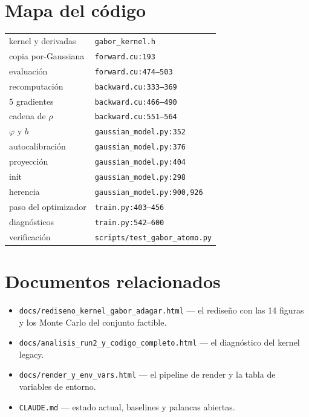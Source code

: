 \documentclass[12pt]{extarticle}
\newcommand{\code}[1]{\texttt{#1}}
\begin{document}
\section{Mapa del código}

\begin{center}\small
\begin{tabular}{@{}ll@{}}
\toprule
kernel y derivadas & \code{gabor\_kernel.h} \\
copia por-Gaussiana & \code{forward.cu:193} \\
evaluación & \code{forward.cu:474--503} \\
recomputación & \code{backward.cu:333--369} \\
5 gradientes & \code{backward.cu:466--490} \\
cadena de $\rho$ & \code{backward.cu:551--564} \\
$\varphi$ y $b$ & \code{gaussian\_model.py:352} \\
autocalibración & \code{gaussian\_model.py:376} \\
proyección & \code{gaussian\_model.py:404} \\
init & \code{gaussian\_model.py:298} \\
herencia & \code{gaussian\_model.py:900,926} \\
paso del optimizador & \code{train.py:403--456} \\
diagnósticos & \code{train.py:542--600} \\
verificación & \code{scripts/test\_gabor\_atomo.py} \\
\bottomrule
\end{tabular}
\end{center}

\section{Documentos relacionados}

\begin{itemize}
\item \code{docs/rediseno\_kernel\_gabor\_adagar.html} --- el rediseño con
      las 14 figuras y los Monte Carlo del conjunto factible.
\item \code{docs/analisis\_run2\_y\_codigo\_completo.html} --- el diagnóstico
      del kernel legacy.
\item \code{docs/render\_y\_env\_vars.html} --- el pipeline de render y la
      tabla de variables de entorno.
\item \code{CLAUDE.md} --- estado actual, baselines y palancas abiertas.
\end{itemize}
\end{document}
